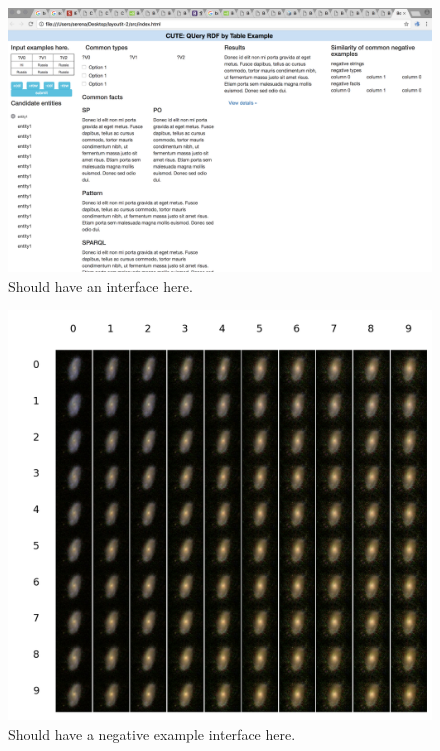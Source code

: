 \documentclass[10pt,conference,letterpaper]{IEEEtran}
\begin{document}

\begin{figure}
    \centering
    \includegraphics[scale=0.35]{figure/ui_2.png}
    \caption{Should have an interface here.}
    \label{fig:UI}
\end{figure}


\begin{figure}
    \centering
    \includegraphics[scale=0.1]{figure/ui.png}
    \caption{Should have a negative example interface here.}
    \label{fig:UI}
\end{figure}
\end{document}
